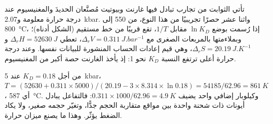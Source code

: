 تأتي الثوابت من تجارب تبادل فيها غارنت وبيوتيت مُصنَّعان الحديدَ
والمغنيسيوم عند درجة حرارة معلومة و\qty{2.07}{kbar}. واثنا عشر حصرًا تجريبيًا من هذا النوع، من 550 إلى
\qty{800}{\celsius}، إذا رُسمت بوضع $\ln K_D$ مقابل $1/T$، تقع قريبًا من خط مستقيم (الشكل
أدناه)؛ وبملاءمتها بالمربعات الصغرى مع $\Delta_r V = \qty{0.311}{J.bar^{-1}}$، تعطي
$\Delta_r H = \qty{52630}{J}$ و$\Delta_r S = \qty{20.19}{J.K^{-1}}$، وهي قيم
إعادات الحساب المنشورة للبيانات نفسها. وعند درجة حرارة أعلى ترتفع النسبة $K_D$
نحو 1: إذ يأخذ الغارنت حصة أكبر من المغنيسيوم.

\begin{omfigure}
\centering
{}
\par{}
\end{omfigure}

من أجل $K_D = 0.18$ عند \qty{5}{kbar}، $T = (52630 + 0.311\times5000)/(20.19 - 3\times8.314
\times\ln 0.18) = 54185/62.96 = \qty{861}{K}$، أي \qty{587}{\celsius}. وكيلوبار إضافي واحد
يضيف $0.311\times1000/62.96 = \qty{4.9}{K}$: فالتفاعل يبادل أيونات ذات شحنة واحدة
بين مواقع متقاربة الحجم جدًّا، وتغيّر حجمه صغير، ولا يكاد الضغط
يؤثّر. وهذا ما يصنع ميزان حرارة.

